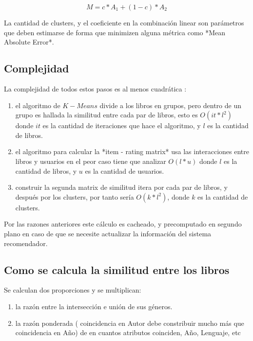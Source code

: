 \documentclass[14pt]{extarticle}
\begin{document}
$$M = c * A_1 + (1-c) * A_2$$

La cantidad de clusters, y el coeficiente en la combinación linear son parámetros que deben estimarse de forma que minimizen alguna métrica como *Mean Absolute Error*.

\subsection{Complejidad}

La complejidad de todos estos pasos es al menos cuadrática : 

\begin{enumerate}
    \item el algoritmo de $K-Means$ divide a los libros en grupos, pero dentro de un  grupo es hallada la similitud entre cada par de libros, esto es $O(it * l^2)$ donde $it$ es la cantidad de iteraciones que hace el algoritmo, y $l$ es la cantidad de libros.

    \item el algoritmo para calcular la *item - rating matrix* usa las interacciones entre libros y usuarios en el peor caso tiene que analizar $O(l * u)$ donde $l$ es la cantidad de libros, y $u$ es la cantidad de usuarios.
    
    \item construir la segunda matrix de similitud itera por cada par de libros, y después por los clusters, por tanto sería $O( k * l^2)$, donde $k$ es la cantidad de clusters.
\end{enumerate}
     
Por las razones anteriores este cálculo es cacheado, y precomputado en segundo plano en caso de que se necesite actualizar la información del sistema recomendador.

\subsection{Como se calcula la similitud entre los libros}
Se calculan dos proporciones y se multiplican:

\begin{enumerate}
    \item la razón entre la intersección e unión de sus géneros.
    \item la razón ponderada ( coincidencia en Autor debe constribuir mucho más que coincidencia en Año) de en cuantos atributos coinciden, Año, Lenguaje, etc
\end{enumerate}
\end{document}
